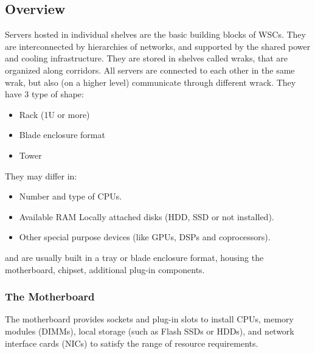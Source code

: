 \documentclass[10pt, oneside]{article}
\begin{document}
\subsection{Overview}
Servers hosted in individual shelves are the basic building blocks of WSCs. They are interconnected by hierarchies of networks, and supported by the shared power and cooling infrastructure. They are stored in  shelves called wraks, that are organized along corridors. All servers are connected to each other in the same wrak, but also (on a higher level) communicate through different wrack.
 They have 3 type of shape:
    \begin{itemize}
        \item Rack (1U or more)
        \item Blade enclosure format 
        \item Tower
    \end{itemize} 
    They may differ in: 
    \begin{itemize}
        \item Number and type of CPUs.
        \item Available RAM Locally attached disks (HDD, SSD or not installed).
        \item Other special purpose devices (like GPUs, DSPs and coprocessors).
    \end{itemize}  
and are usually built in a tray or blade enclosure format, housing the motherboard, chipset, additional plug-in components.

\subsubsection{The Motherboard}
The motherboard provides sockets and plug-in slots to install CPUs, memory modules (DIMMs), local storage (such as Flash SSDs or HDDs), and network interface cards (NICs) to satisfy the range of resource requirements.
\end{document}
